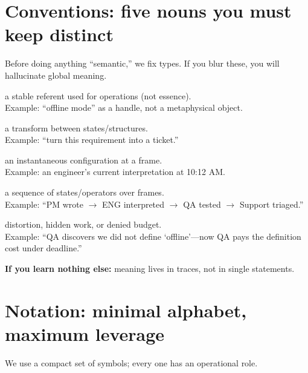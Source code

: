 \documentclass[11pt]{article}
\begin{document}
\section{Conventions: five nouns you must keep distinct}

Before doing anything ``semantic,'' we fix types. If you blur these, you will hallucinate global meaning.

\begin{description}[leftmargin=2.2em,labelsep=0.6em]
  \item[Entity:] a stable referent used for operations (not essence). \\
  Example: ``offline mode'' as a handle, not a metaphysical object.

  \item[Operator:] a transform between states/structures. \\
  Example: ``turn this requirement into a ticket.''

  \item[State:] an instantaneous configuration at a frame. \\
  Example: an engineer's current interpretation at 10:12 AM.

  \item[Trace:] a sequence of states/operators over frames. \\
  Example: ``PM wrote $\rightarrow$ ENG interpreted $\rightarrow$ QA tested $\rightarrow$ Support triaged.''

  \item[Cost:] distortion, hidden work, or denied budget. \\
  Example: ``QA discovers we did not define `offline'---now QA pays the definition cost under deadline.''
\end{description}

\textbf{If you learn nothing else:} meaning lives in traces, not in single statements.

\section{Notation: minimal alphabet, maximum leverage}

We use a compact set of symbols; every one has an operational role.
\end{document}
